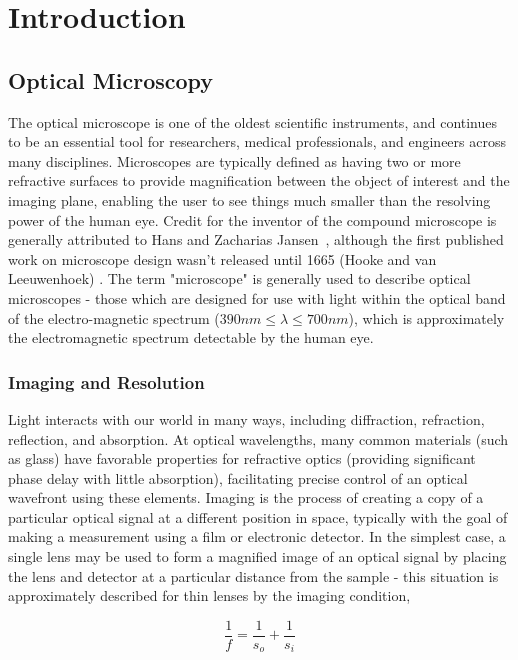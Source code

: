 \chapter{Introduction}\label{ch:introduction}

\section{Optical Microscopy}

The optical microscope is one of the oldest scientific instruments, and continues to be an essential tool for researchers, medical professionals, and engineers across many disciplines. Microscopes are typically defined as having two or more refractive surfaces to provide magnification between the object of interest and the imaging plane, enabling the user to see things much smaller than the resolving power of the human eye. Credit for the inventor of the compound microscope is generally attributed to Hans and Zacharias Jansen~\cite{van2010origins}, although the first published work on microscope design wasn't released until 1665 (Hooke and van Leeuwenhoek) \cite{natureMilestones,hookeMicrographica}. The term "microscope" is generally used to describe optical microscopes - those which are designed for use with light within the optical band of the electro-magnetic spectrum ($390nm \leq \lambda \leq 700nm$), which is approximately the electromagnetic spectrum detectable by the human eye.

\subsection{Imaging and Resolution}
Light interacts with our world in many ways, including diffraction, refraction, reflection, and absorption. At optical wavelengths, many common materials (such as glass) have favorable properties for refractive optics (providing significant phase delay with little absorption), facilitating precise control of an optical wavefront using these elements. Imaging is the process of creating a copy of a particular optical signal at a different position in space, typically with the goal of making a measurement using a film or electronic detector. In the simplest case, a single lens may be used to form a magnified image of an optical signal by placing the lens and detector at a particular distance from the sample - this situation is approximately described for thin lenses by the imaging condition,

\begin{equation}
\frac{1}{f} = \frac{1}{s_o} + \frac{1}{s_i}
\end{equation}

